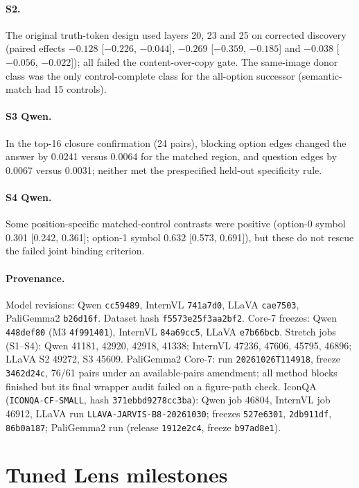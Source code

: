 \documentclass[11pt]{article}
\begin{document}
\paragraph{S2.} The original truth-token design used layers 20, 23 and 25 on corrected discovery (paired effects $-0.128$ [$-0.226$, $-0.044$], $-0.269$ [$-0.359$, $-0.185$] and $-0.038$ [$-0.056$, $-0.022$]); all failed the content-over-copy gate. The same-image donor class was the only control-complete class for the all-option successor (semantic-match had 15 controls).

\paragraph{S3 Qwen.} In the top-16 closure confirmation (24 pairs), blocking option edges changed the answer by 0.0241 versus 0.0064 for the matched region, and question edges by 0.0067 versus 0.0031; neither met the prespecified held-out specificity rule.

\paragraph{S4 Qwen.} Some position-specific matched-control contrasts were positive (option-0 symbol 0.301 [0.242, 0.361]; option-1 symbol 0.632 [0.573, 0.691]), but these do not rescue the failed joint binding criterion.

\paragraph{Provenance.} Model revisions: Qwen \texttt{cc59489}, InternVL \texttt{741a7d0}, LLaVA \texttt{cae7503}, PaliGemma2 \texttt{b26d16f}. Dataset hash \texttt{f5573e25f3aa2bf2}. Core-7 freezes: Qwen \texttt{448def80} (M3 \texttt{4f991401}), InternVL \texttt{84a69cc5}, LLaVA \texttt{e7b66bcb}. Stretch jobs (S1--S4): Qwen 41181, 42920, 42918, 41338; InternVL 47236, 47606, 45795, 46896; LLaVA S2 49272, S3 45609. PaliGemma2 Core-7: run \texttt{20261026T114918}, freeze \texttt{3462d24c}, 76/61 pairs under an available-pairs amendment; all method blocks finished but its final wrapper audit failed on a figure-path check. IconQA (\texttt{ICONQA-CF-SMALL}, hash \texttt{371ebbd9278cc3ba}): Qwen job 46804, InternVL job 46912, LLaVA run \texttt{LLAVA-JARVIS-B8-20261030}; freezes \texttt{527e6301}, \texttt{2db911df}, \texttt{86b0a187}; PaliGemma2 run (release \texttt{1912e2c4}, freeze \texttt{b97ad8e1}).

\section{Tuned Lens milestones}
\label{app:tuned}
\end{document}
